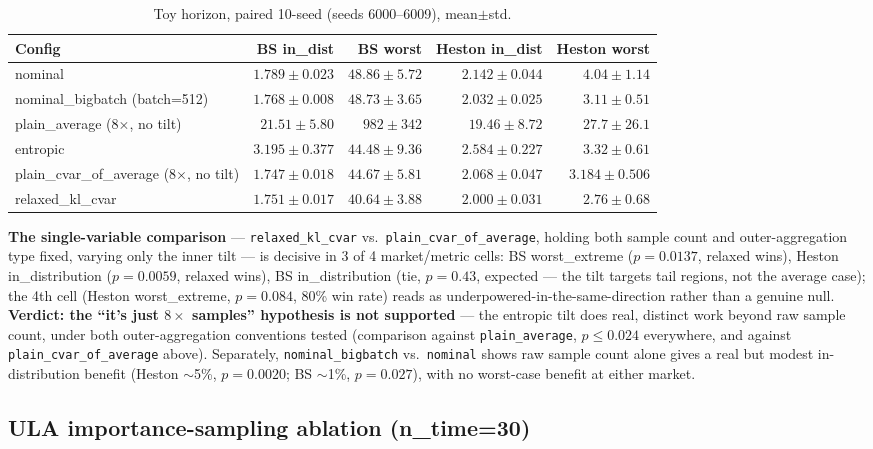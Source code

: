 \documentclass[11pt]{article}
\begin{document}
\begin{table}[h]
  \centering
  \caption{Toy horizon, paired 10-seed (seeds 6000--6009), mean$\pm$std.}
  \label{tab:confound}
  \small
  \begin{tabular}{lrrrr}
    \toprule
    Config & BS in\_dist & BS worst & Heston in\_dist & Heston worst \\
    \midrule
    nominal & $1.789\pm0.023$ & $48.86\pm5.72$ & $2.142\pm0.044$ & $4.04\pm1.14$ \\
    nominal\_bigbatch (batch=512) & $1.768\pm0.008$ & $48.73\pm3.65$ & $2.032\pm0.025$ & $3.11\pm0.51$ \\
    plain\_average (8$\times$, no tilt) & $21.51\pm5.80$ & $982\pm342$ & $19.46\pm8.72$ & $27.7\pm26.1$ \\
    entropic & $3.195\pm0.377$ & $44.48\pm9.36$ & $2.584\pm0.227$ & $3.32\pm0.61$ \\
    plain\_cvar\_of\_average (8$\times$, no tilt) & $1.747\pm0.018$ & $44.67\pm5.81$ & $2.068\pm0.047$ & $3.184\pm0.506$ \\
    relaxed\_kl\_cvar & $1.751\pm0.017$ & $40.64\pm3.88$ & $2.000\pm0.031$ & $2.76\pm0.68$ \\
    \bottomrule
  \end{tabular}
\end{table}

\textbf{The single-variable comparison} --- \texttt{relaxed\_kl\_cvar} vs.\
\texttt{plain\_cvar\_of\_average}, holding both sample count and outer-aggregation type fixed,
varying only the inner tilt --- is decisive in 3 of 4 market/metric cells: BS worst\_extreme
($p=0.0137$, relaxed wins), Heston in\_distribution ($p=0.0059$, relaxed wins), BS in\_distribution
(tie, $p=0.43$, expected --- the tilt targets tail regions, not the average case); the 4th cell
(Heston worst\_extreme, $p=0.084$, 80\% win rate) reads as underpowered-in-the-same-direction
rather than a genuine null. \textbf{Verdict: the ``it's just $8\times$ samples'' hypothesis is
not supported} --- the entropic tilt does real, distinct work beyond raw sample count, under both
outer-aggregation conventions tested (comparison against \texttt{plain\_average}, $p\le0.024$
everywhere, and against \texttt{plain\_cvar\_of\_average} above). Separately,
\texttt{nominal\_bigbatch} vs.\ \texttt{nominal} shows raw sample count alone gives a real but
modest in-distribution benefit (Heston $\sim$5\%, $p=0.0020$; BS $\sim$1\%, $p=0.027$), with no
worst-case benefit at either market.

\subsection{ULA importance-sampling ablation (n\_time=30)}
\label{sec:is}
\end{document}
